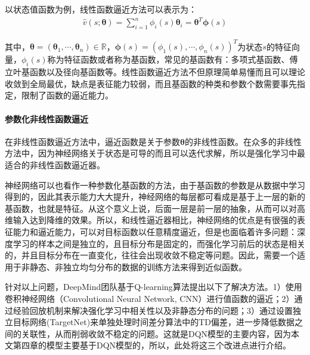 以状态值函数为例，线性函数逼近方法可以表示为：
\begin{equation}
\begin{aligned}
\hat{v}(s;\bm{\theta})=\sum^{n}_{i=1}\phi_{i}(s) \bm{\theta}_{i}=\bm{\theta }^{T} \bm{\phi}(s)
\end{aligned}
\end{equation}

其中，$\bm{\theta}=(\bm{\theta}_{1},\cdots,\bm{\theta}_{n}) \in \mathbb{R}$，$\bm{\phi}(s)=(\phi_{1}(s),\cdots,\phi_{n}(s))^{T}$为状态$s$的特征向量，$\phi_{i}(s)$称为特征函数或者称为基函数，常见的基函数有：多项式基函数、傅立叶基函数以及径向基函数等。线性函数逼近方法不但原理简单易懂而且可以理论收敛到全局最优，缺点是表征能力较弱，而且基函数的种类和参数个数需要事先指定，限制了函数的逼近能力。


\paragraph{参数化非线性函数逼近}
在非线性函数逼近方法中，逼近函数是关于参数$\bm{\theta}$的非线性函数。在众多的非线性方法中，因为神经网络关于状态是可导的而且可以迭代求解，所以是强化学习中最适合的非线性函数逼近器。

神经网络可以也看作一种参数化基函数的方法，由于基函数的参数是从数据中学习得到的，因此其表示能力大大提升，神经网络的每层都可看成是基于上一层的新的基函数，也就是特征。从这个意义上说，后面一层是前一层的抽象，从而可以对高维输入达到降维的效果。所以，和线性逼近器相比，神经网络的优点是有很强的表征能力和逼近能力，可以对目标函数以任意精度逼近，但是也面临着许多问题：深度学习的样本之间是独立的，且目标分布是固定的，而强化学习前后的状态是相关的，并且目标分布在一直变化，往往会出现收敛不稳定等问题。因此，需要一个适用于非静态、非独立均匀分布的数据的训练方法来得到近似函数。

针对以上问题，DeepMind团队基于Q-learning算法提出以下了解决方法。1）使用卷积神经网络（Convolutional Neural Network, CNN）进行值函数的逼近；2）通过经验回放机制来解决强化学习中相关性以及非静态分布的问题；3）通过设置独立目标网络(TargetNet)来单独处理时间差分算法中的TD偏差，进一步降低数据之间的关联性，从而削弱收敛不稳定的问题。这就是DQN模型的主要内容，因为本文第四章的模型主要基于DQN模型的，所以，此处将这三个改进点进行介绍。

